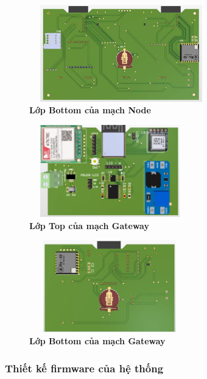 \documentclass{article} %
\begin{document}
\begin{itemize}
		\begin{figure}[!ht]
			\centering
			\includegraphics[width=8cm,height=4.2cm]{Images/Node Bottom.png}
			\caption[Lớp Bottom của mạch Node ]{\bfseries \fontsize{12pt}{0pt}\selectfont Lớp Bottom của mạch Node }
			\label{Nodebot}
		\end{figure}
		
		\begin{figure}[!ht]
			\centering
			\includegraphics[width=7cm,height=4cm]{Images/Gatewaytop.png}
			\caption[Lớp Top của mạch Gateway ]{\bfseries \fontsize{12pt}{0pt}\selectfont Lớp Top của mạch Gateway }
			\label{Gatewaytop}
		\end{figure}
		
		\begin{figure}[!ht]
			\centering
			\includegraphics[width=7cm,height=4cm]{Images/Gatewaybottom.png}
			\caption[Lớp Bottom của mạch Gateway ]{\bfseries \fontsize{12pt}{0pt}\selectfont Lớp Bottom của mạch Gateway }
			\label{Gatewaybot}
		\end{figure}
	\end{itemize}
	
	
	\newpage
	\subsubsection{Thiết kế firmware của hệ thống}
\end{document}
